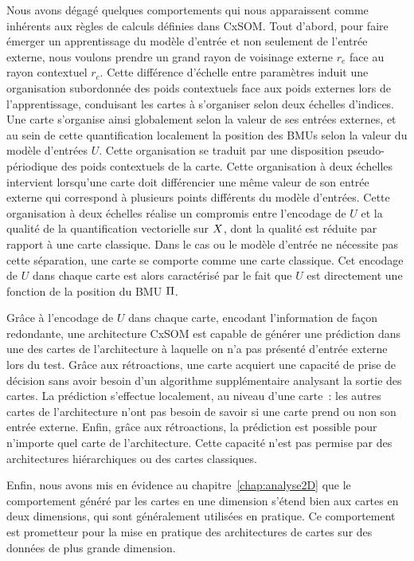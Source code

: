 Nous avons dégagé quelques comportements qui nous apparaissent comme inhérents aux règles de calculs définies dans CxSOM.
Tout d'abord, pour faire émerger un apprentissage du modèle d'entrée et non seulement de l'entrée externe, nous voulons prendre un grand rayon de voisinage externe $r_e$ face au rayon contextuel $r_c$. 
Cette différence d'échelle entre paramètres induit une organisation subordonnée des poids contextuels face aux poids externes lors de l'apprentissage, conduisant les cartes à s'organiser selon deux échelles d'indices. Une carte s'organise ainsi globalement selon la valeur de ses entrées externes, et au sein de cette quantification localement la position des BMUs selon la valeur du modèle d'entrées $U$. Cette organisation se traduit par une disposition pseudo-périodique des poids contextuels de la carte.
Cette organisation à deux échelles intervient lorsqu'une carte doit différencier une même valeur de son entrée externe qui correspond à plusieurs points différents du modèle d'entrées. 
Cette organisation à deux échelles réalise un compromis entre l'encodage de $U$ et la qualité de la quantification vectorielle sur $X$, dont la qualité est réduite par rapport à une carte classique. Dans le cas ou le modèle d'entrée ne nécessite pas cette séparation, une carte se comporte comme une carte classique.
Cet encodage de $U$ dans chaque carte est alors caractérisé par le fait que $U$ est directement une fonction de la position du BMU $\Pi$.
    
Grâce à l'encodage de $U$ dans chaque carte, encodant l'information de façon redondante, une architecture CxSOM est capable de générer une prédiction dans une des cartes de l'architecture à laquelle on n'a pas présenté d'entrée externe lors du test. Grâce aux rétroactions, une carte acquiert une capacité de prise de décision sans avoir besoin d'un algorithme supplémentaire analysant la sortie des cartes. La prédiction s'effectue localement, au niveau d'une carte~: les autres cartes de l'architecture n'ont pas besoin de savoir si une carte prend ou non son entrée externe. Enfin, grâce aux rétroactions, la prédiction est possible pour n'importe quel carte de l'architecture. Cette capacité n'est pas permise par des architectures hiérarchiques ou des cartes classiques.
   
Enfin, nous avons mis en évidence au chapitre~\ref{chap:analyse2D} que le comportement généré par les cartes en une dimension s'étend bien aux cartes en deux dimensions, qui sont généralement utilisées en pratique. Ce comportement est prometteur pour la mise en pratique des architectures de cartes sur des données de plus grande dimension.

